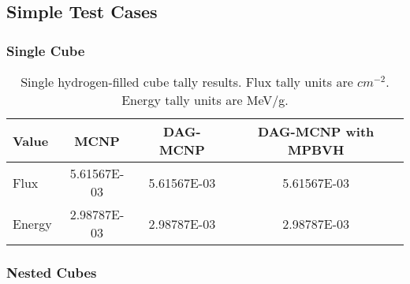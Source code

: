 \subsection{Simple Test Cases}\label{appsec:mpbvh_simple_tests}

  \subsubsection{Single Cube}

  \begin{table}[H]
    \small
    \begin{center}
      \begin{tabular}{lccc}
        \toprule
        Value & MCNP & DAG-MCNP & DAG-MCNP with MPBVH \\
        \toprule
        \hline
        Flux   & 5.61567E-03 & 5.61567E-03 & 5.61567E-03 \\
        Energy & 2.98787E-03 & 2.98787E-03 & 2.98787E-03 \\
        \bottomrule
      \end{tabular}
      \caption[Single hydrogen-filled cube tally results.]{Single
        hydrogen-filled cube tally results. Flux tally units are
        $cm^{-2}$. Energy tally units are MeV/g.}
      \label{nestedspheres}
    \end{center}
  \end{table}


  \subsubsection{Nested Cubes}

